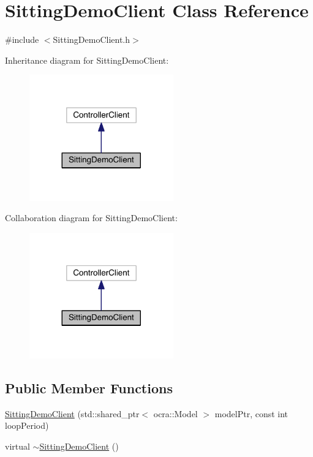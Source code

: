 \hypertarget{classSittingDemoClient}{}\section{Sitting\+Demo\+Client Class Reference}
\label{classSittingDemoClient}


{\ttfamily \#include $<$Sitting\+Demo\+Client.\+h$>$}



Inheritance diagram for Sitting\+Demo\+Client\+:\nopagebreak
\begin{figure}[H]
\begin{center}
\leavevmode
\includegraphics[width=176pt]{classSittingDemoClient__inherit__graph}
\end{center}
\end{figure}


Collaboration diagram for Sitting\+Demo\+Client\+:\nopagebreak
\begin{figure}[H]
\begin{center}
\leavevmode
\includegraphics[width=176pt]{classSittingDemoClient__coll__graph}
\end{center}
\end{figure}
\subsection*{Public Member Functions}
\begin{DoxyCompactItemize}
\item 
\hyperlink{classSittingDemoClient_aedcb6c4ad7b4fa19f1b188e700c0a079}{Sitting\+Demo\+Client} (std\+::shared\+\_\+ptr$<$ ocra\+::\+Model $>$ model\+Ptr, const int loop\+Period)
\item 
virtual \hyperlink{classSittingDemoClient_a0fb7ded5e44b2b60d7f89c22386154b7}{$\sim$\+Sitting\+Demo\+Client} ()
\end{DoxyCompactItemize}
